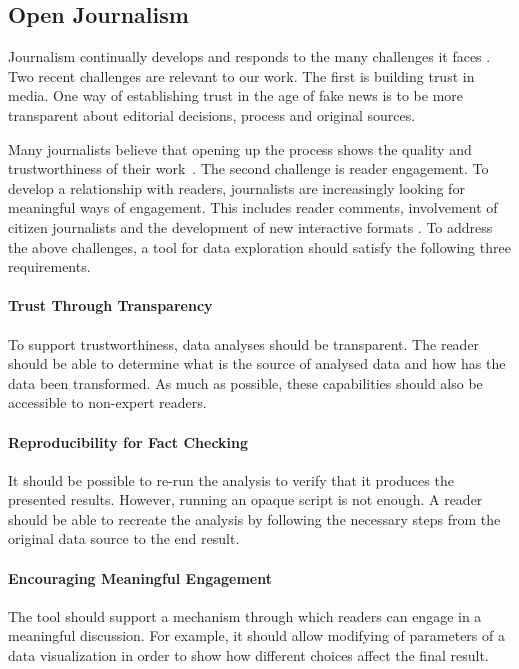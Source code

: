 \documentclass[manuscript,review,anonymous]{acmart}
\begin{document}
\subsection{Open Journalism}
Journalism continually develops and responds to the many challenges it faces \cite{future}.
Two recent challenges are relevant to our work. The first is building trust in media.
One way of establishing trust in the age of fake news is to be more transparent about editorial
decisions, process and original sources.

Many journalists believe that opening up the process
shows the quality and trustworthiness of their work~\cite{transparency}.
The second challenge is reader engagement. To develop a relationship with readers, journalists are
increasingly looking for meaningful ways of engagement. This includes reader comments, involvement
of citizen journalists \cite{comments,citizen} and the development of new interactive formats
\cite{youdraw}. To address the above challenges, a tool for data exploration should satisfy the
following three requirements.

\paragraph{Trust Through Transparency}
To support trustworthiness, data analyses should be transparent. The reader should be able to
determine what is the source of analysed data and how has the data been transformed. As much as
possible, these capabilities should also be accessible to non-expert readers.

\paragraph{Reproducibility for Fact Checking}
It should be possible to re-run the analysis to verify that it produces the presented results.
However, running an opaque script is not enough. A reader should be able to recreate the analysis
by following the necessary steps from the original data source to the end result.

\paragraph{Encouraging Meaningful Engagement}
The tool should support a mechanism through which readers can engage in a meaningful discussion.
For example, it should allow modifying of parameters of a data visualization in order to show
how different choices affect the final result.
\end{document}
